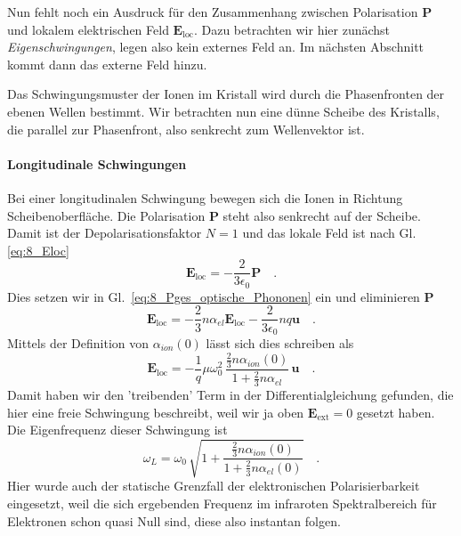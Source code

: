Nun fehlt noch ein Ausdruck für den Zusammenhang zwischen Polarisation $\bm{P}$ und lokalem elektrischen Feld $\bm{E}_\text{loc}$. Dazu betrachten wir hier zunächst \emph{Eigenschwingungen}, legen also kein externes Feld an. Im nächsten Abschnitt kommt dann das externe Feld hinzu.

Das Schwingungsmuster der Ionen im Kristall wird durch die Phasenfronten der ebenen Wellen bestimmt. Wir betrachten nun eine dünne Scheibe des Kristalls, die parallel zur Phasenfront, also senkrecht zum Wellenvektor ist.


\paragraph*{Longitudinale Schwingungen} Bei einer longitudinalen Schwingung bewegen sich die Ionen in Richtung Scheibenoberfläche. Die Polarisation $\bm{P}$ steht also senkrecht auf der Scheibe. Damit ist der Depolarisationsfaktor $N=1$ und das lokale Feld ist nach Gl.     \ref{eq:8_Eloc}
\begin{equation}
    \bm{E}_\text{loc}  = - \frac{2}{3\epsilon_0} \bm{P} \quad .
\end{equation}
Dies setzen wir in Gl.~\ref{eq:8_Pges_optische_Phononen} ein und eliminieren $\bm{P}$
\begin{equation}
    \bm{E}_\text{loc} = - \frac{2}{3} n \alpha_{el} \bm{E}_\text{loc}  - \frac{2}{3\epsilon_0} n q \bm{u} \quad .
\end{equation}
Mittels der Definition von $\alpha_{ion}(0)$  lässt sich dies schreiben als
\begin{equation}
    \bm{E}_\text{loc} = - \frac{1}{q} \mu \omega_0^2 \, \frac{\frac{2}{3} n \alpha_{ion}(0)}{1 + \frac{2}{3} n \alpha_{el} } 
    \, \bm{u}
    \quad .
\end{equation}
Damit haben wir den 'treibenden' Term in der Differentialgleichung gefunden, die hier eine freie Schwingung beschreibt, weil wir ja oben $\bm{E}_\text{ext} = 0$ gesetzt haben. Die Eigenfrequenz dieser Schwingung ist
\begin{equation}
    \omega_L = \omega_0 \, \sqrt{1 + \frac{\frac{2}{3} n \alpha_{ion}(0)}{1 + \frac{2}{3} n \alpha_{el}(0) }} \quad .
\end{equation}
Hier wurde auch der statische Grenzfall der elektronischen Polarisierbarkeit eingesetzt, weil die sich ergebenden Frequenz im infraroten Spektralbereich für Elektronen schon quasi Null sind, diese also instantan folgen.


